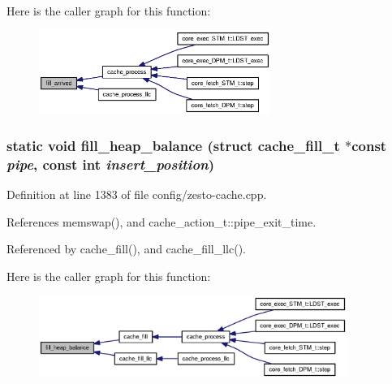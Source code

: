 Here is the caller graph for this function:\nopagebreak
\begin{figure}[H]
\begin{center}
\leavevmode
\includegraphics[width=214pt]{config_2zesto-cache_8cpp_4d5f99649851ca3db130a4a6228a1f35_icgraph}
\end{center}
\end{figure}
\subsubsection[{fill\_\-heap\_\-balance}]{\setlength{\rightskip}{0pt plus 5cm}static void fill\_\-heap\_\-balance (struct {\bf cache\_\-fill\_\-t} $\ast$const  {\em pipe}, \/  const int {\em insert\_\-position})\hspace{0.3cm}{\tt  [static]}}\label{config_2zesto-cache_8cpp_45008d7fc6cedc3c5187a70e4cfc1d4a}




Definition at line 1383 of file config/zesto-cache.cpp.

References memswap(), and cache\_\-action\_\-t::pipe\_\-exit\_\-time.

Referenced by cache\_\-fill(), and cache\_\-fill\_\-llc().

Here is the caller graph for this function:\nopagebreak
\begin{figure}[H]
\begin{center}
\leavevmode
\includegraphics[width=284pt]{config_2zesto-cache_8cpp_45008d7fc6cedc3c5187a70e4cfc1d4a_icgraph}
\end{center}
\end{figure}
